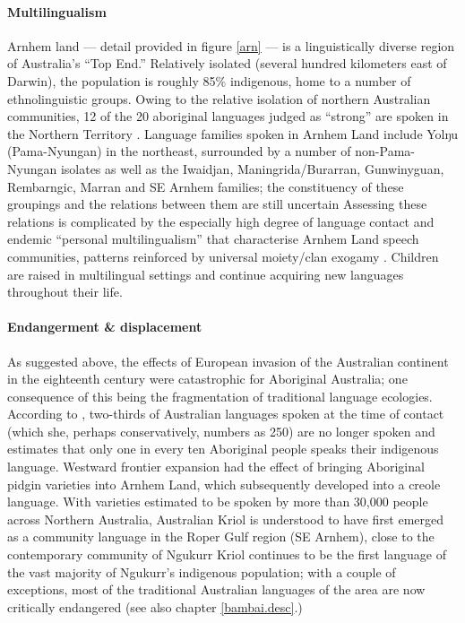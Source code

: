 \documentclass[12pt,dvipsnames]{report}
\begin{document}
\paragraph*{Multilingualism}

Arnhem land --- detail provided in figure \ref{arn} --- is a linguistically diverse region of Australia's ``Top End.'' Relatively isolated (several hundred kilometers east of Darwin), the population is roughly 85\% indigenous, home to a number of ethnolinguistic groups. Owing to the relative isolation of northern Australian communities, 12 of the 20 aboriginal languages judged as ``strong'' are spoken in the Northern Territory \citep[3]{Schmidt1990}. Language families spoken in Arnhem Land include Yolŋu (Pama-Nyungan) in the northeast, surrounded by a number of non-Pama-Nyungan isolates as well as the Iwaidjan, Maningrida/Burarran, Gunwinyguan, Rembarngic, Marran and SE Arnhem families; the constituency of these groupings and the relations between them are still uncertain \citetext{see \textit{e.g.}, \citealp{Green2003} for the proto-Arnhem proposal.} Assessing these relations is complicated by the especially high degree of language contact and endemic ``personal multilingualism'' that characterise Arnhem Land speech communities, patterns reinforced by universal moiety/clan exogamy \citetext{\citealp{McConvell2011,Evans2001}, see also \citealp[Ch. 1]{Williams1986,Wilkinson1991} for a discussion of clan exogamy in Yolŋu society}. Children are raised in multilingual settings and continue acquiring new languages throughout their life. 

\paragraph*{Endangerment \& displacement}

As suggested above, the effects of European invasion of the Australian continent in the eighteenth century were catastrophic for Aboriginal Australia; one consequence of this being the fragmentation of traditional language ecologies. According to \citet[1]{Schmidt1990}, two-thirds of Australian languages spoken at the time of contact (which she, perhaps conservatively, numbers as 250) are no longer spoken and estimates that only one in every ten Aboriginal people speaks their indigenous language. Westward frontier expansion had the effect of bringing Aboriginal pidgin varieties into Arnhem Land, which subsequently developed into a creole language. With varieties estimated to be spoken by more than 30,000 people across Northern Australia, Australian Kriol is understood to have first emerged as a community language in the Roper Gulf region (SE Arnhem), close to the contemporary community of Ngukurr \citetext{\textit{e.g.}, \citealp{Harris1986a}, see also \citealp{Phillips2011} for an overview.} Kriol continues to be the first language of the vast majority of Ngukurr's indigenous population; with a couple of exceptions, most of the traditional Australian languages of the area are now critically endangered (see also chapter \ref{bambai.desc}.)
\end{document}
